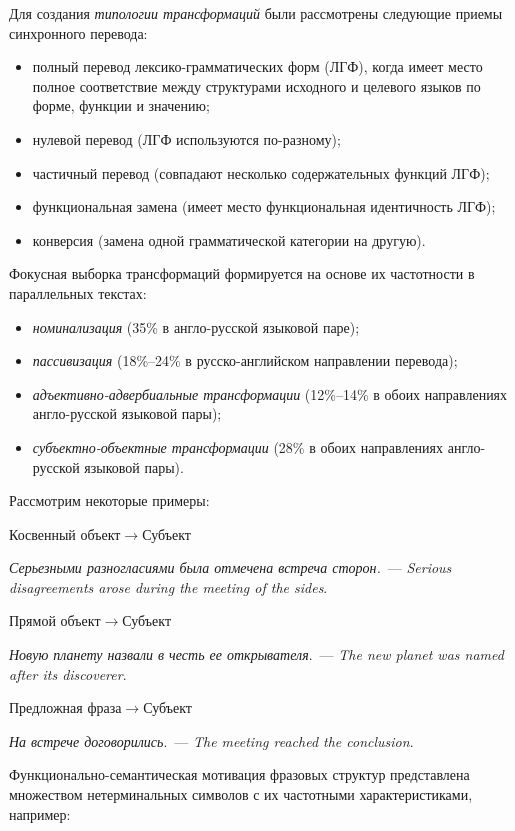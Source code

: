 \begin{multicols}{2}
   Для создания \textit{типологии трансформаций} были рассмотрены
следующие приемы синхронного перевода:
   \begin{itemize}
     \item полный перевод лексико-грамматических форм (ЛГФ), когда имеет
место полное соответствие между структурами исходного и целевого языков по
форме, функции и значению;
     \item нулевой перевод (ЛГФ используются по-раз\-ному);
     \item частичный перевод (совпадают несколько содержательных функций
ЛГФ);
     \item функциональная замена (имеет место функциональная идентичность
ЛГФ);
     \item конверсия (замена одной грамматической категории на другую).
     \end{itemize}

     Фокусная выборка трансформаций формируется на основе их частотности в
параллельных текстах:
\begin{itemize}
\item     \textit{номинализация} (35\% в англо-русской языковой паре);
\item
     \textit{пассивизация} (18\%--24\% в русско-английском направлении
перевода);
   \item
     \textit{адъективно-адвербиальные трансформации} (12\%--14\% в обоих
направлениях анг\-ло-рус\-ской языковой пары);
     \item
     \textit{субъектно-объектные трансформации} (28\% в обоих направлениях
анг\-ло-рус\-ской языковой пары).
\end{itemize}

     Рассмотрим некоторые примеры:

     Косвенный объект\;$\rightarrow$\;Субъект

     \textit{Серьезными разногласиями была отмечена встреча сторон.}~---
\textit{Serious disagreements arose during the meeting of the sides}.

     Прямой объект\;$\rightarrow$\;Субъект

     \textit{Новую планету назвали в честь ее открывателя}.~--- \textit{The new
planet was named after its discoverer}.

     Предложная фраза\;$\rightarrow$\;Субъект

     \textit{На встрече договорились}.~--- \textit{The meeting reached the
conclusion}.

     Функционально-семантическая мотивация фразовых структур представлена
множеством нетерминальных символов с их частотными характеристиками,
например:


\end{multicols}
